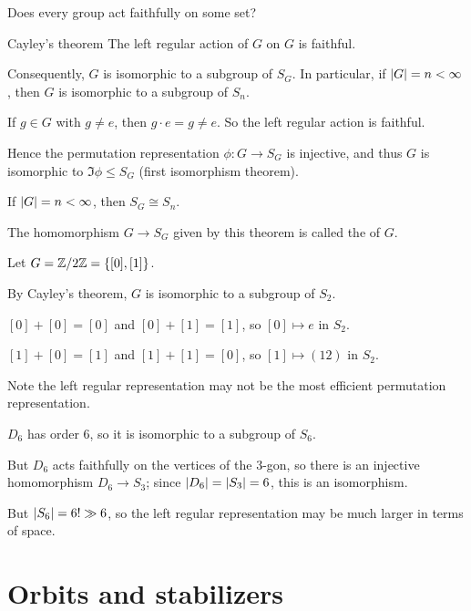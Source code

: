 \documentclass[12pt,letterpaper]{report}
\begin{document}
Does every group act faithfully on some set?

\begin{thm}{Cayley's theorem}{}
  The left regular action of $G$ on $G$ is faithful.

  Consequently, $G$ is isomorphic to a subgroup of $S_G$.
  In particular, if $\lvert G\rvert = n < \infty$, then $G$ is isomorphic to a subgroup of $S_n$.
\end{thm}

\begin{thmproof}
  If $g \in G$ with $g \neq e$, then $g \cdot e = g \neq e$.
  So the left regular action is faithful.

  Hence the permutation representation $\phi \colon G \to S_G$ is injective, and thus $G$ is
  isomorphic to $\Im\phi \leq S_G$ (first isomorphism theorem).

  If $\lvert G\rvert = n < \infty$, then $S_G \cong S_n$.
\end{thmproof}

The homomorphism $G \to S_G$ given by this theorem is called the 
of $G$.

\begin{ex}
  Let $G = \mathbb{Z}/{2}\mathbb{Z} = \{[0], [1]\}$.

  By Cayley's theorem, $G$ is isomorphic to a subgroup of $S_2$.

  $[0] + [0] = [0]$ and $[0] + [1] = [1]$, so $[0] \mapsto e$ in $S_2$.

  $[1] + [0] = [1]$ and $[1] + [1] = [0]$, so $[1] \mapsto (12)$ in $S_2$.
\end{ex}

Note the left regular representation may not be the most efficient permutation representation.

\begin{ex}
  $D_6$ has order 6, so it is isomorphic to a subgroup of $S_6$.

  But $D_6$ acts faithfully on the vertices of the 3-gon, so there is an injective homomorphism
  $D_6 \to S_3$; since $\lvert D_6\rvert = \lvert S_3\rvert = 6$, this is an isomorphism.

  But $\lvert S_6\rvert = 6! \gg 6$, so the left regular representation may be much larger in terms of
  space.
\end{ex}

\section{Orbits and stabilizers}
\end{document}
